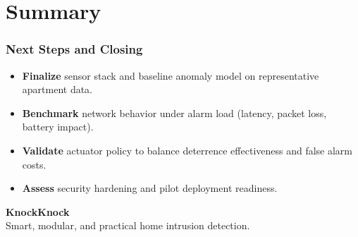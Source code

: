 \section{Summary}

\footlinecolor{}
\begin{frame}
\frametitle{Next Steps and Closing}
\begin{itemize}
\item \textbf{Finalize} sensor stack and baseline anomaly model on representative apartment data.
\item \textbf{Benchmark} network behavior under alarm load (latency, packet loss, battery impact).
\item \textbf{Validate} actuator policy to balance deterrence effectiveness and false alarm costs.
\item \textbf{Assess} security hardening and pilot deployment readiness.
\end{itemize}
\vspace{0.4cm}
\centering
\textbf{KnockKnock}\\
Smart, modular, and practical home intrusion detection.
\end{frame}

\backmatter
